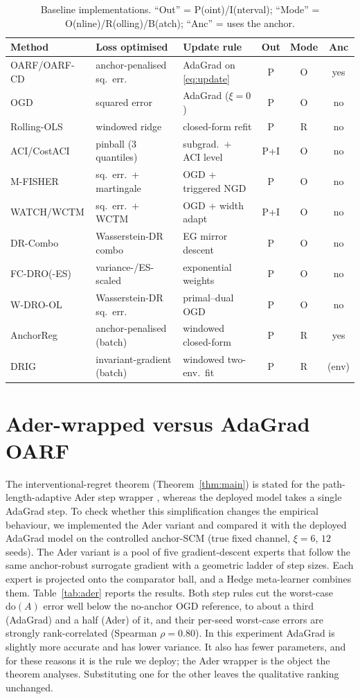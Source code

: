 \documentclass[authoryear,preprint,12pt]{elsarticle}
\theoremstyle{plain}
\theoremstyle{remark}
\newcommand{\doop}{\mathrm{do}}
\newcommand{\OARF}{\textsc{OARF}}
\newcommand{\OARFCD}{\textsc{OARF-CD}}
\begin{document}
\begin{table}[htbp]
\centering
\caption{Baseline implementations. ``Out'' = P(oint)/I(nterval); ``Mode'' =
O(nline)/R(olling)/B(atch); ``Anc'' = uses the anchor.}
\label{tab:baseimpl}
\small
\begin{tabular}{lllccc}
\toprule
Method & Loss optimised & Update rule & Out & Mode & Anc\\
\midrule
\OARF{}/\OARFCD{} & anchor-penalised sq.\ err. & AdaGrad on \eqref{eq:update} & P & O & yes\\
OGD & squared error & AdaGrad ($\xi=0$) & P & O & no\\
Rolling-OLS & windowed ridge & closed-form refit & P & R & no\\
ACI/CostACI & pinball (3 quantiles) & subgrad.\ + ACI level & P+I & O & no\\
M-FISHER & sq.\ err.\ + martingale & OGD + triggered NGD & P & O & no\\
WATCH/WCTM & sq.\ err.\ + WCTM & OGD + width adapt & P+I & O & no\\
DR-Combo & Wasserstein-DR combo & EG mirror descent & P & O & no\\
FC-DRO(-ES) & variance-/ES-scaled & exponential weights & P & O & no\\
W-DRO-OL & Wasserstein-DR sq.\ err. & primal--dual OGD & P & O & no\\
AnchorReg & anchor-penalised (batch) & windowed closed-form & P & R & yes\\
DRIG & invariant-gradient (batch) & windowed two-env.\ fit & P & R & (env)\\
\bottomrule
\end{tabular}
\end{table}

\section{Ader-wrapped versus AdaGrad OARF}\label{app:ader}
The interventional-regret theorem (Theorem~\ref{thm:main}) is stated for the
path-length-adaptive Ader step wrapper \citep{zhang2018adaptive}, whereas the deployed
model takes a single AdaGrad step. To check whether this simplification changes the
empirical behaviour, we implemented the Ader variant and compared it with the deployed
AdaGrad model on the controlled anchor-SCM (true fixed channel, $\xi=6$, $12$ seeds).
The Ader variant is a pool of five gradient-descent experts that follow the same
anchor-robust surrogate gradient with a geometric ladder of step sizes. Each expert is
projected onto the comparator ball, and a Hedge meta-learner combines them.
Table~\ref{tab:ader} reports the results. Both step rules cut the worst-case $\doop(A)$ error well below the no-anchor OGD reference, to about a third (AdaGrad) and a half (Ader) of it, and their per-seed worst-case
errors are strongly rank-correlated (Spearman $\rho=0.80$). In this experiment AdaGrad
is slightly more accurate and has lower variance. It also has fewer parameters, and for
these reasons it is the rule we deploy; the Ader wrapper is the object the theorem
analyses. Substituting one for the other leaves the qualitative ranking unchanged.
\end{document}
